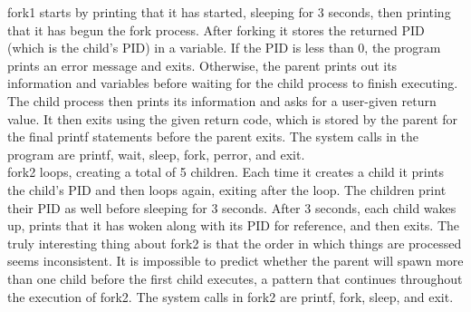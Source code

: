 \documentclass{article}
\begin{document}
\indent fork1 starts by printing that it has started, sleeping for 3 seconds, then printing that it has begun the fork process.
After forking it stores the returned PID (which is the child's PID) in a variable. If the PID is less than 0, the program prints an error message and exits. Otherwise, the parent prints out its information and variables before waiting for the child process to finish executing.
The child process then prints its information and asks for a user-given return value. It then exits using the given return code, which is stored by the parent for the final printf statements before the parent exits.
The system calls in the program are printf, wait, sleep, fork, perror, and exit.\\

fork2 loops, creating a total of 5 children. Each time it creates a child it prints the child's PID and then loops again, exiting after the loop. The children print their PID as well before sleeping for 3 seconds. After 3 seconds, each child wakes up, prints that it has woken along with its PID for reference, and then exits. The truly interesting thing about fork2 is that the order in which things are processed seems inconsistent. It is impossible to predict whether the parent will spawn more than one child before the first child executes, a pattern that continues throughout the execution of fork2. 
The system calls in fork2 are printf, fork, sleep, and exit.
	
\end{document}
